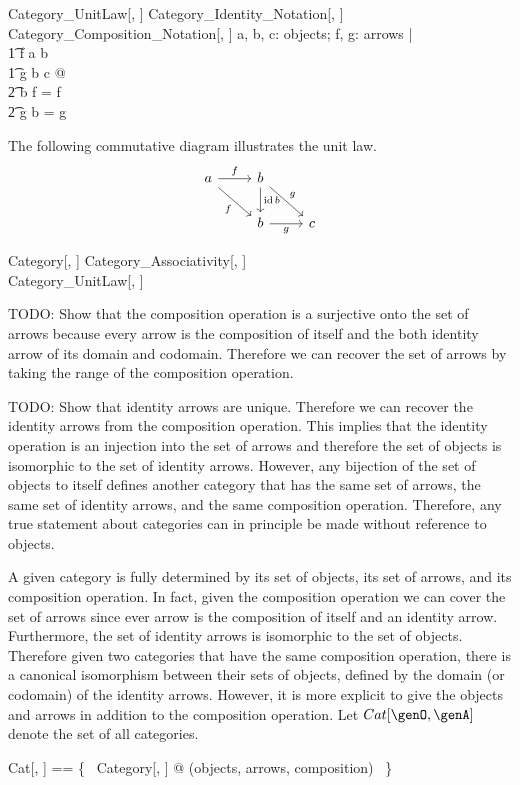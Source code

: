 \documentclass{amsart}
\begin{document}
\begin{schema}{Category\_UnitLaw}[\genO, \genA]
	Category\_Identity\_Notation[\genO, \genA] \\
	Category\_Composition\_Notation[\genO, \genA]
\where
	\forall a, b, c: objects; f, g: arrows | \\
	\t1	f \in a \arrCat b \land \\
	\t1	g \in b \arrCat c @ \\
	\t2		\idCat b \compCat f = f \land \\
	\t2		g \compCat \idCat b = g
\end{schema}

The following commutative diagram illustrates the unit law.
$$
\begin{tikzcd}
a \arrow{r}{f}
\arrow[swap]{rd}{f} &
b \arrow{d}{\idCat b}
\arrow{rd}{g} \\
&
b \arrow[swap]{r}{g} &
c
\end{tikzcd}
$$

\begin{schema}{Category}[\genO, \genA]
	Category\_Associativity[\genO, \genA] \\
	Category\_UnitLaw[\genO, \genA]
\end{schema}

TODO: Show that the composition operation is a surjective onto the set of arrows because every arrow is the composition of itself
and the both identity arrow of its domain and codomain. Therefore we can recover the set of
arrows by taking the range of the composition operation.

TODO: Show that identity arrows are unique. Therefore we can recover the identity arrows from the composition operation.
This implies that the identity operation is an injection into the set of arrows and therefore the set of objects is isomorphic to
the set of identity arrows. However, any bijection of the set of objects to itself defines another category that has the same set of arrows,
the same set of identity arrows, and the same composition operation.
Therefore, any true statement about categories can in principle be made without reference to objects.

A given category is fully determined by its set of objects, its set of arrows, and its composition operation.
In fact, given the composition operation we can cover the set of arrows since ever arrow is the composition of
itself and an identity arrow. Furthermore, the set of identity arrows is isomorphic to the set of objects.
Therefore given two categories that have the same composition operation, there is a canonical isomorphism
between their sets of objects, defined by the domain (or codomain) of the identity arrows.
However, it is more explicit to give the objects and arrows in addition to the composition operation.
Let $Cat[\genO, \genA]$ denote the set of all categories.
\begin{zed}
	Cat[\genO, \genA] == \{~ Category[\genO, \genA] @ (objects, arrows, composition) ~\}
\end{zed}
\end{document}
